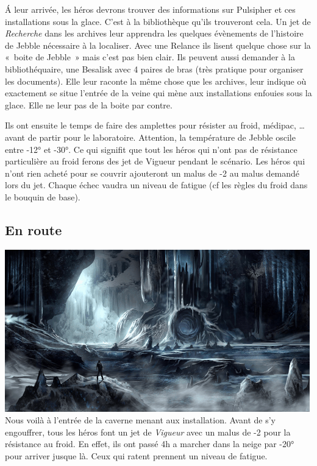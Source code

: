 \'A leur arrivée, les héros devrons trouver des informations sur Pulsipher et ces installations sous la glace. C’est à la bibliothèque qu’ils trouveront cela. Un jet de \emph{Recherche} dans les archives leur apprendra les quelques évènements de l’histoire de Jebble nécessaire à la localiser. Avec une Relance ils lisent quelque chose sur la «~boite de Jebble~» mais c'est pas bien clair. Ils peuvent aussi demander à la bibliothéquaire, une Besalisk avec 4 paires de bras (très pratique pour organiser les documents). Elle leur raconte la même chose que les archives, leur indique où exactement se situe l’entrée de la veine qui mène aux installations enfouies sous la glace. Elle ne leur pas de la boite par contre.

Ils ont ensuite le temps de faire des amplettes pour résister au froid, médipac, \ldots avant de partir pour le laboratoire. Attention, la température de Jebble oscile entre -12° et -30°. Ce qui signifit que tout les héros qui n’ont pas de résistance particulière au froid ferons des jet de Vigueur pendant le scénario. Les héros qui n’ont rien acheté pour se couvrir ajouteront un malus de -2 au malus demandé lors du jet. Chaque échec vaudra un niveau de fatigue (cf les règles du froid dans le bouquin de base).

\subsection{En route}
\noindent\includegraphics[width=\linewidth]{_img/dos-au-muur/jebble-cave.png}
Nous voilà à l’entrée de la caverne menant aux installation. Avant de s’y engouffrer, tous les héros font un jet de \emph{Vigueur} avec un malus de -2 pour la résistance au froid. En effet, ils ont passé 4h a marcher dans la neige par -20° pour arriver jusque là. Ceux qui ratent prennent un niveau de fatigue.

